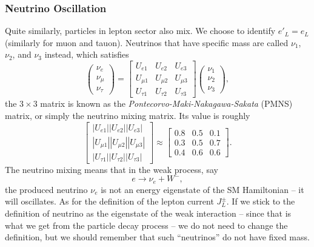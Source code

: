 \subsubsection{Neutrino Oscillation}
Quite similarly, particles in lepton sector also mix.
We choose to identify $e'_L = e_L$ (similarly for muon and tauon).
Neutrinos that have specific mass are called $\nu_1$, $\nu_2$, and $\nu_3$ instead, which satisfies
\begin{equation}
	\begin{pmatrix}
		\nu_{e} \\ \nu_{\mu} \\ \nu_{\tau}
	\end{pmatrix} = 
	\begin{bmatrix}
		U_{e 1} & U_{e 2} & U_{e 3} \\
		U_{\mu 1} & U_{\mu 2} & U_{\mu 3} \\
		U_{\tau 1} & U_{\tau 2} & U_{\tau 3}
	\end{bmatrix}
	\begin{pmatrix}
		\nu_{1} \\ \nu_{2} \\ \nu_{3}
	\end{pmatrix},
\end{equation}
the $3 \times 3$ matrix is known as the \textit{Pontecorvo-Maki-Nakagawa-Sakata} (PMNS) matrix, or simply the neutrino mixing matrix.
Its value is roughly
\begin{equation}
	\begin{bmatrix}
		\left|U_{e 1}\right|\left|U_{e 2}\right|\left|U_{e 3}\right| \\
		\left|U_{\mu 1}\right|\left|U_{\mu 2}\right|\left|U_{\mu 3}\right| \\
		\left|U_{\tau 1}\right|\left|U_{\tau 2}\right|\left|U_{\tau 3}\right|
	\end{bmatrix} \approx
	\begin{bmatrix}
		0.8 & 0.5 & 0.1 \\
		0.3 & 0.5 & 0.7 \\
		0.4 & 0.6 & 0.6
	\end{bmatrix}.
\end{equation}
The neutrino mixing means that in the weak process, say
\begin{equation}
	e \rightarrow \nu_e + W^-,
\end{equation}
the produced neutrino $\nu_e$ is not an energy eigenstate of the SM Hamiltonian -- it will oscillates.
As for the definition of the lepton current $J^\pm_L$. 
If we stick to the definition of neutrino as the eigenstate of the weak interaction -- since that is what we get from the particle decay process -- we do not need to change the definition, but we should remember that such ``neutrinos'' do not have fixed mass.


